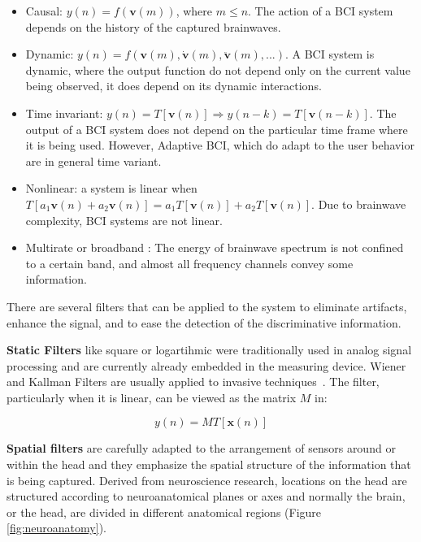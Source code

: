 \begin{itemize}
\item Causal:  $ y(n) = f( \mathbf{v}(m) ) $, where $ m \leq n $.  The action of a BCI system depends on the history of the captured brainwaves.
\item Dynamic: $ y(n) = f( \mathbf{v}(m),  \mathbf{\dot{v}}(m),\mathbf{\ddot{v}}(m),...) $.  A BCI system is dynamic, where the output function do not depend only on the current value being observed, it does depend on its dynamic interactions.
\item Time invariant: $ y(n) = T\left[ \mathbf{v}(n) \right] \Rightarrow y(n-k) = T\left[ \mathbf{v}(n-k) \right] $.  The output of a BCI system does not depend on the particular time frame where it is being used.  However, Adaptive BCI, which do adapt to the user behavior are in general time variant.
\item Nonlinear: a system is linear when $T\left[ a_1 \mathbf{v}(n) + a_2 \mathbf{v}(n) \right]  = a_1 T \left[ \mathbf{v}(n) \right] + a_2 T \left[ \mathbf{v}(n) \right] $. Due to brainwave complexity, BCI systems are not linear.
\item Multirate or broadband \cite{Miller2010}:  The energy of brainwave spectrum is not confined to a certain band, and almost all frequency channels convey some information.
\end{itemize}

There are several filters that can be applied to the system to eliminate artifacts, enhance the signal, and to ease the detection of the discriminative information.

\textbf{Static Filters} like square or logartihmic were traditionally used in analog signal processing and are currently already embedded in the measuring device.  Wiener and Kallman Filters are usually applied to invasive techniques~\cite{He2013}.  The filter, particularly when it is linear, can be viewed as the matrix $M$ in:

\begin{equation}
y(n) = M T\left[\mathbf{x}(n)\right]
\label{eq:filters}
\end{equation}

\textbf{Spatial filters} are carefully adapted to the arrangement of sensors around or within the head and they emphasize the spatial structure of the information that is being captured. Derived from neuroscience research, locations on the head are structured according to neuroanatomical planes or axes and normally the brain, or the head, are divided in different anatomical regions (Figure \ref{fig:neuroanatomy}).   

